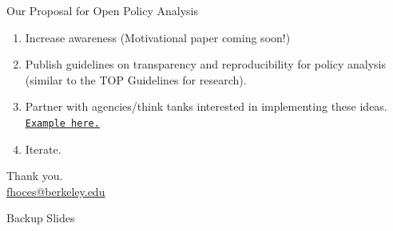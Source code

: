 \documentclass{beamer}
\begin{document}
\begin{frame}{Our Proposal for Open Policy Analysis}
\begin{enumerate}

\item Increase awareness (Motivational paper coming soon!)

\item Publish guidelines on transparency and reproducibility for policy analysis (similar to the TOP Guidelines for research). 

\item Partner with agencies/think tanks interested in implementing these ideas.
\texttt{\href{https://rpubs.com/fhoces/dd_cbo_mw}{\underline{Example here.}}}

\item Iterate.
\end{enumerate}
\end{frame}


\begin{frame}[noframenumbering]
\begin{center}
\vspace*{4em}
{\Large Thank you.\\
\bigskip
{\Large  \href{mailto:fhoces@berkeley.edu}{fhoces@berkeley.edu}  }
}
\end{center}
\end{frame}


\begin{frame}[noframenumbering]
\begin{center}
\vspace*{4em}
{\Large Backup Slides
}
\end{center}
\end{frame}
\end{document}
